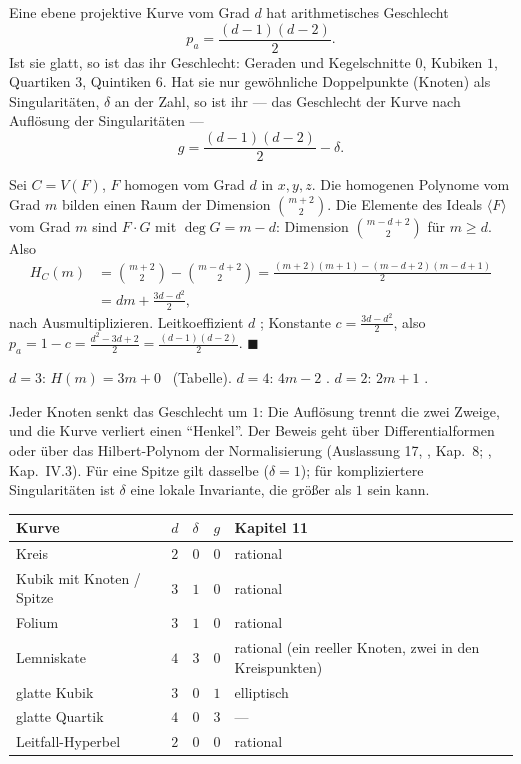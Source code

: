 \begin{merksatz}
Eine ebene projektive Kurve vom Grad $d$ hat arithmetisches Geschlecht
\[ p_a = \frac{(d - 1)(d - 2)}{2} . \]
Ist sie glatt, so ist das ihr Geschlecht: Geraden und Kegelschnitte $0$, Kubiken $1$, Quartiken $3$, Quintiken $6$. Hat sie nur gewöhnliche Doppelpunkte (Knoten) als Singularitäten, $\delta$ an der Zahl, so ist ihr  --- das Geschlecht der Kurve nach Auflösung der Singularitäten ---
\[ g = \frac{(d - 1)(d - 2)}{2} - \delta . \]

Sei $C = V(F)$, $F$ homogen vom Grad $d$ in $x, y, z$. Die homogenen Polynome vom Grad $m$ bilden einen Raum der Dimension $\binom{m + 2}{2}$. Die Elemente des Ideals $\langle F\rangle$ vom Grad $m$ sind $F\cdot G$ mit $\deg G = m - d$: Dimension $\binom{m - d + 2}{2}$ für $m\ge d$. Also
\begin{align*}
H_C(m) &= \binom{m + 2}{2} - \binom{m - d + 2}{2} = \frac{(m + 2)(m + 1) - (m - d + 2)(m - d + 1)}{2}\\
&= dm + \frac{3d - d^{2}}{2},
\end{align*}
nach Ausmultiplizieren. Leitkoeffizient $d$ \checkmark; Konstante $c = \frac{3d - d^{2}}{2}$, also $p_a = 1 - c = \frac{d^{2} - 3d + 2}{2} = \frac{(d - 1)(d - 2)}{2}$. $\blacksquare$

$d = 3$: $H(m) = 3m + 0$ \checkmark\ (Tabelle). $d = 4$: $4m - 2$ \checkmark. $d = 2$: $2m + 1$ \checkmark.

Jeder Knoten senkt das Geschlecht um $1$: Die Auflösung trennt die zwei Zweige, und die Kurve verliert einen \enquote{Henkel}. Der Beweis geht über Differentialformen oder über das Hilbert-Polynom der Normalisierung (Auslassung 17, , Kap.~8; , Kap.~IV.3). Für eine Spitze gilt dasselbe ($\delta = 1$); für kompliziertere Singularitäten ist $\delta$ eine lokale Invariante, die größer als $1$ sein kann.

\begin{center}
{\small
\renewcommand{\arraystretch}{1.5}
\begin{tabular}{@{}P{3.4cm}P{0.8cm}P{1.0cm}P{1.0cm}P{2.0cm}@{}}
\toprule
\textbf{Kurve} & $d$ & $\delta$ & $g$ & \textbf{Kapitel 11}\\
\midrule
Kreis & $2$ & $0$ & $0$ & rational\\
Kubik mit Knoten / Spitze & $3$ & $1$ & $0$ & rational\\
Folium & $3$ & $1$ & $0$ & rational\\
Lemniskate & $4$ & $3$ & $0$ & rational (ein reeller Knoten, zwei in den Kreispunkten)\\
glatte Kubik & $3$ & $0$ & $1$ & elliptisch\\
glatte Quartik & $4$ & $0$ & $3$ & ---\\
Leitfall-Hyperbel & $2$ & $0$ & $0$ & rational\\
\bottomrule
\end{tabular}}
\end{center}


\end{merksatz}
